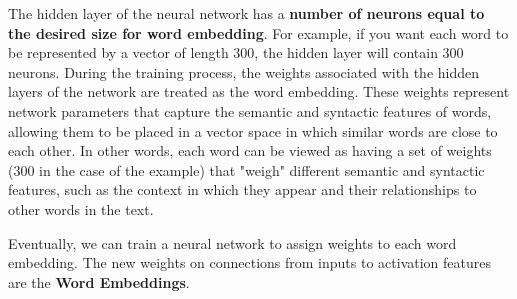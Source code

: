 The hidden layer of the neural network has a \textbf{number of neurons equal to the desired size for word embedding}. For example, if you want each word to be represented by a vector of length 300, the hidden layer will contain 300 neurons. During the training process, the weights associated with the hidden layers of the network are treated as the word embedding. These weights represent network parameters that capture the semantic and syntactic features of words, allowing them to be placed in a vector space in which similar words are close to each other. In other words, each word can be viewed as having a set of weights (300 in the case of the example) that "weigh" different semantic and syntactic features, such as the context in which they appear and their relationships to other words in the text.

Eventually, we can train a neural network to assign weights to each word embedding. The new weights on connections from inputs to activation features are the \textbf{Word Embeddings}.






